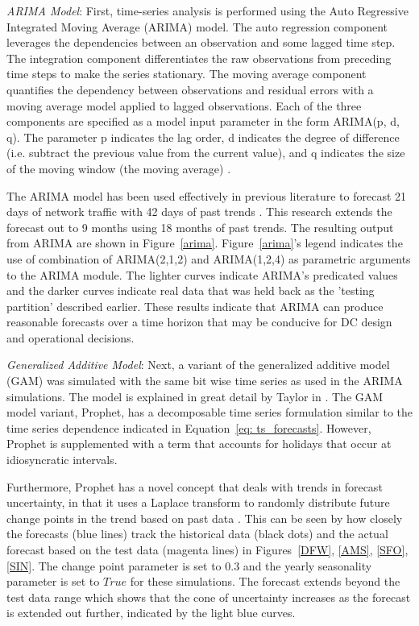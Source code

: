     \emph{ARIMA Model}: First, time-series analysis is performed using the Auto Regressive Integrated Moving Average (ARIMA) model. The auto regression component leverages the dependencies between an observation and some lagged time step. The integration component differentiates the raw observations from preceding time steps to make the series stationary. The moving average component quantifies the dependency between observations and residual errors with a moving average model applied to lagged observations. Each of the three components are specified as a model input parameter in the form ARIMA(p, d, q). The parameter p indicates the lag order, d indicates the degree of difference (i.e. subtract the previous value from the current value), and q indicates the size of the moving window (the moving average) \cite{arima_def}. 
    
    The ARIMA model has been used effectively in previous literature to forecast 21 days of network traffic with 42 days of past trends \cite{zhuang15}. This research extends the forecast out to 9 months using 18 months of past trends. The resulting output from ARIMA are shown in Figure~\ref{arima}. Figure~\ref{arima}’s legend indicates the use of combination of ARIMA(2,1,2) and ARIMA(1,2,4) as parametric arguments to the ARIMA module. The lighter curves indicate ARIMA's predicated values and the darker curves indicate real data that was held back as the 'testing partition' described earlier. These results indicate that ARIMA can produce reasonable forecasts over a time horizon that may be conducive for DC design and operational decisions. 
    
    
    
    \emph{Generalized Additive Model}: Next, a variant of the generalized additive model (GAM) was simulated with the same bit wise time series as used in the ARIMA simulations. The model is explained in great detail by Taylor in \cite{fbprophet}. The GAM model variant, Prophet, has a decomposable time series formulation similar to the time series dependence indicated in Equation~\ref{eq: ts_forecasts}. However, Prophet is supplemented with a term that accounts for holidays that occur at idiosyncratic  intervals. 
    
    Furthermore, Prophet has a novel concept that deals with trends in forecast uncertainty, in that it uses a Laplace transform to randomly distribute future change points in the trend based on past data \cite{fbprophet}. This can be seen by how closely the forecasts (blue lines) track the historical data (black dots) and the actual forecast based on the test data (magenta lines) in Figures~\ref{DFW}, \ref{AMS}, \ref{SFO}, \ref{SIN}. The change point parameter is set to $0.3$ and the yearly seasonality parameter is set to $True$ for these simulations. The forecast extends beyond the test data range which shows that the cone of uncertainty increases as the forecast is extended out further, indicated by the light blue curves. 
    
